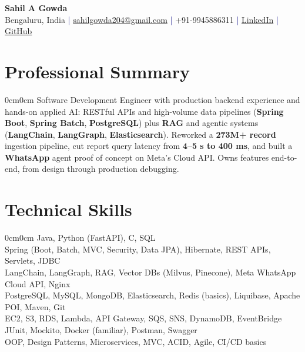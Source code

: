 \documentclass[10pt, letterpaper]{article}
\newenvironment{onecolentry}{%
  \begin{adjustwidth}{0cm}{0cm}}{%
  \end{adjustwidth}}
\newcommand{\skillrow}[2]{%
  \noindent\makebox[3.05cm][l]{\fontsize{9pt}{11pt}\selectfont\textbf{\textcolor{navy}{#1}}}\hspace{8pt}%
  {\fontsize{9pt}{11pt}\selectfont #2}\\[2pt]%
}
\begin{document}
\begin{center}
  {\fontsize{20pt}{20pt}\selectfont\bfseries\color{navy} Sahil A Gowda}\\[4pt]
  {\fontsize{9pt}{11pt}\selectfont
    \textcolor{bodytext}{Bengaluru, India}
    \enspace\textcolor{navy}{|}\enspace
    \href{mailto:sahilgowda204@gmail.com}{sahilgowda204@gmail.com}
    \enspace\textcolor{navy}{|}\enspace
    \textcolor{bodytext}{+91-9945886311}
    \enspace\textcolor{navy}{|}\enspace
    \href{https://www.linkedin.com/in/sahil-a-gowda-551b32270/}{LinkedIn}
    \enspace\textcolor{navy}{|}\enspace
    \href{https://github.com/SahilAGowda}{GitHub}
  }
\end{center}

\vspace{1pt}

\section{Professional Summary}
\begin{onecolentry}
{\fontsize{9.5pt}{13.5pt}\selectfont
Software Development Engineer with production backend experience and hands-on applied AI: RESTful APIs and high-volume data pipelines (\textbf{Spring Boot}, \textbf{Spring Batch}, \textbf{PostgreSQL}) plus \textbf{RAG} and agentic systems (\textbf{LangChain}, \textbf{LangGraph}, \textbf{Elasticsearch}). Reworked a \textbf{273M+ record} ingestion pipeline, cut report query latency from \textbf{4--5 s to 400 ms}, and built a \textbf{WhatsApp} agent proof of concept on Meta's Cloud API. Owns features end-to-end, from design through production debugging.
}
\end{onecolentry}

\vspace{1.2mm}
\section{Technical Skills}
\begin{onecolentry}
\skillrow{Languages}{Java, Python (FastAPI), C, SQL}
\skillrow{Java Tech Stack}{Spring (Boot, Batch, MVC, Security, Data JPA), Hibernate, REST APIs, Servlets, JDBC}
\skillrow{AI/ML Stack}{LangChain, LangGraph, RAG, Vector DBs (Milvus, Pinecone), Meta WhatsApp Cloud API, Nginx}
\skillrow{Databases \& Tools}{PostgreSQL, MySQL, MongoDB, Elasticsearch, Redis (basics), Liquibase, Apache POI, Maven, Git}
\skillrow{AWS Services}{EC2, S3, RDS, Lambda, API Gateway, SQS, SNS, DynamoDB, EventBridge}
\skillrow{Testing \& DevOps}{JUnit, Mockito, Docker (familiar), Postman, Swagger}
\skillrow{Core Concepts}{OOP, Design Patterns, Microservices, MVC, ACID, Agile, CI/CD basics}
\end{onecolentry}
\end{document}
